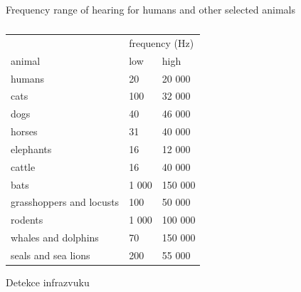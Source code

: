 \documentclass[10pt, notes]{beamer}
\begin{document}
\begin{frame}{Frequency range of hearing for humans and other selected animals}
    \begin{table}
        \footnotesize
        \caption{\cite{britannica}}
        \begin{tabular}{lll}
            \toprule
            &\multicolumn{2}{l}{frequency (Hz)}\\
            animal &  low& 	high\\
            \midrule
            humans      &20 	&20 000 \\
            cats        &100 	&32 000 \\
            dogs        &40 	&46 000 \\
            horses      &31 	&40 000 \\
          elephants     &16 	&12 000 \\
            cattle      &16 	&40 000 \\
            bats        &1 000 	&150 000\\
grasshoppers and locusts&100 	&50 000 \\
            rodents 	&1 000 	&100 000\\
whales and dolphins 	&70 	&150 000\\
seals and sea lions 	&200 	&55 000 \\
            \bottomrule
        \end{tabular}
    \end{table}
\end{frame}


\begin{frame}{Detekce infrazvuku}
    
\end{frame}
\end{document}
